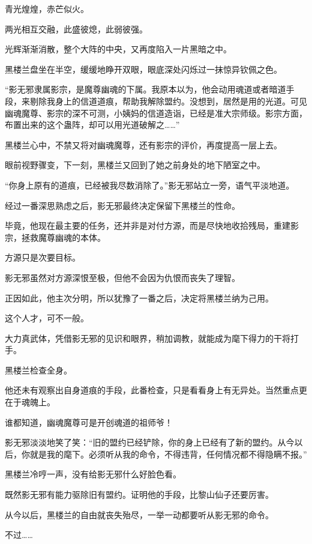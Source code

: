 
\begin{this_body}

青光煌煌，赤芒似火。

两光相互交融，此盛彼熄，此弱彼强。

光辉渐渐消散，整个大阵的中央，又再度陷入一片黑暗之中。

黑楼兰盘坐在半空，缓缓地睁开双眼，眼底深处闪烁过一抹惊异钦佩之色。

“影无邪隶属影宗，是魔尊幽魂的下属。我原本以为，他会动用魂道或者暗道手段，来剔除我身上的信道道痕，帮助我解除盟约。没想到，居然是用的光道。可见幽魂魔尊、影宗的深不可测，小姨妈的信道造诣，已经是准大宗师级。影宗方面，布置出来的这个蛊阵，却可以用光道破解之……”

黑楼兰心中，不禁又将对幽魂魔尊，还有影宗的评价，再度提高一层上去。

眼前视野骤变，下一刻，黑楼兰又回到了她之前身处的地下陋室之中。

“你身上原有的道痕，已经被我尽数消除了。”影无邪站立一旁，语气平淡地道。

经过一番深思熟虑之后，影无邪最终决定保留下黑楼兰的性命。

毕竟，他现在最主要的任务，还并非是对付方源，而是尽快地收拾残局，重建影宗，拯救魔尊幽魂的本体。

方源只是次要目标。

影无邪虽然对方源深恨至极，但他不会因为仇恨而丧失了理智。

正因如此，他主次分明，所以犹豫了一番之后，决定将黑楼兰纳为己用。

这个人才，可不一般。

大力真武体，凭借影无邪的见识和眼界，稍加调教，就能成为麾下得力的干将打手。

黑楼兰检查全身。

他还未有观察出自身道痕的手段，此番检查，只是看看身上有无异处。当然重点更在于魂魄上。

谁都知道，幽魂魔尊可是开创魂道的祖师爷！

影无邪淡淡地笑了笑：“旧的盟约已经铲除，你的身上已经有了新的盟约。从今以后，你就是我的麾下。必须听从我的命令，不得违背，任何情况都不得隐瞒不报。”

黑楼兰冷哼一声，没有给影无邪什么好脸色看。

既然影无邪有能力驱除旧有盟约。证明他的手段，比黎山仙子还要厉害。

从今以后，黑楼兰的自由就丧失殆尽，一举一动都要听从影无邪的命令。

不过……


\end{this_body}
